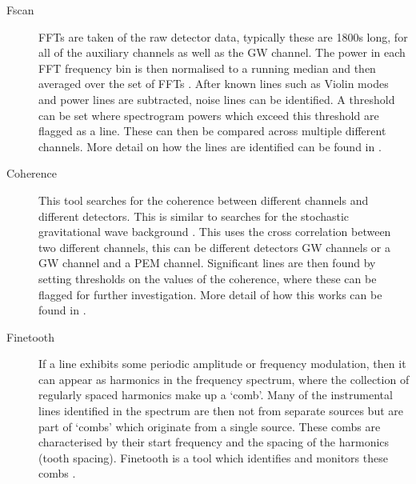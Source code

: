 \begin{description}
	\item[Fscan] \Glspl{FFT} are taken of the raw detector data, typically these are 1800s long, for all of the auxiliary channels as well as the \gls{GW} channel.
	The power in each \gls{FFT} frequency bin is then normalised to a running median and then averaged over the set of \glspl{FFT} \citep{coughlin2010NoiseLine}.  After known lines such as Violin modes and power lines are
	subtracted, noise lines can be identified. A threshold can be set where spectrogram powers which exceed this threshold are flagged as a line. These
	can then be compared across multiple different channels. More detail on how the
	lines are identified can be found in \citep{coughlin2010NoiseLine}.
	
    \item[Coherence] This tool searches for the coherence between different
	channels and different detectors. This is similar to searches for the stochastic
	gravitational wave background \citep{allen1999DetectingStochastic}. This uses the cross correlation between two different channels, this can be different detectors \gls{GW} channels or a \gls{GW} channel and a \gls{PEM} channel. 
	Significant lines are then found by setting thresholds on the values of the coherence, where these can be flagged for further investigation.
	More detail of how this works can be found in \citep{covas2018IdentificationMitigation,coughlin2010NoiseLine,}.
	
	\item[Finetooth] If a line exhibits some periodic amplitude or frequency modulation, then it can appear as harmonics in the frequency spectrum, where the collection of regularly spaced harmonics make up a `comb'. 
	Many of the instrumental lines identified in the spectrum are then not from separate sources but are part of `combs' which originate from a single source. 
	These combs are characterised by their start frequency and the spacing of the harmonics (tooth spacing).
	Finetooth is a tool which identifies and monitors these combs \citep{neunzertDailyComb}.


\end{description}
